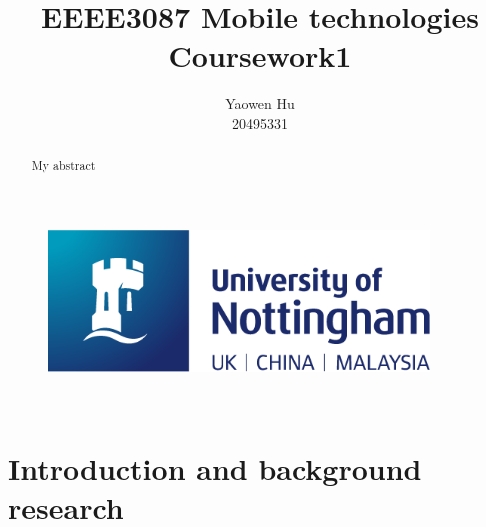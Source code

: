 \documentclass{article}
\title{EEEE3087 Mobile technologies \\Coursework1}
\author{Yaowen Hu\\20495331}
\begin{document}

\begin{titlepage}
\begin{figure}
    \vspace{-4em}
    \centering
    \includegraphics[width=0.9\textwidth]{images/logo.png}
\end{figure}

\vfill
\maketitle
\vfill

\\
\centering{\today}
\thispagestyle{empty}
\pagebreak
\end{titlepage}


\tableofcontents
\thispagestyle{empty}
\pagebreak


\begin{abstract}
My abstract
\thispagestyle{empty}
\pagebreak
\end{abstract}


\section{Introduction and background research}

\pagestyle{plain}
\setcounter{page}{1}
\end{document}
